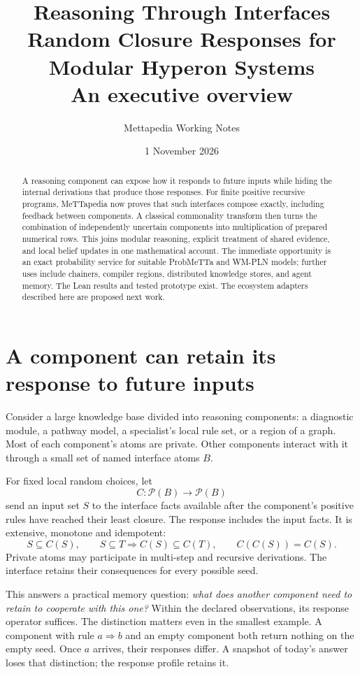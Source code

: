 \documentclass[11pt,a4paper]{article}
\title{Reasoning Through Interfaces\\[3pt]
  \large Random Closure Responses for Modular Hyperon Systems\\
  An executive overview}
\author{Mettapedia Working Notes}
\date{1 November 2026}
\newcommand{\Pow}{\mathcal P}
\begin{document}
\maketitle

\begin{abstract}
A reasoning component can expose how it responds to future inputs while
hiding the internal derivations that produce those responses. For finite
positive recursive programs, MeTTapedia now proves that such interfaces
compose exactly, including feedback between components. A classical
commonality transform then turns the combination of independently uncertain
components into multiplication of prepared numerical rows. This joins
modular reasoning, explicit treatment of shared evidence, and local belief
updates in one mathematical account. The immediate opportunity is an exact
probability service for suitable ProbMeTTa and WM-PLN models; further uses
include chainers, compiler regions, distributed knowledge stores, and agent
memory. The Lean results and tested prototype exist. The ecosystem adapters
described here are proposed next work.
\end{abstract}

\section{A component can retain its response to future inputs}

Consider a large knowledge base divided into reasoning components: a diagnostic
module, a pathway model, a specialist's local rule set, or a region of a graph.
Most of each component's atoms are private. Other components interact with it
through a small set of named interface atoms $B$.

For fixed local random choices, let
\[
 C:\Pow(B)\longrightarrow\Pow(B)
\]
send an input set $S$ to the interface facts available after the component's
positive rules have reached their least closure. The response includes the
input facts. It is extensive, monotone and idempotent:
\[
 S\subseteq C(S),\qquad
 S\subseteq T\Rightarrow C(S)\subseteq C(T),\qquad C(C(S))=C(S).
\]
Private atoms may participate in multi-step and recursive derivations.
The interface retains their consequences for every possible seed.

This answers a practical memory question: \emph{what does another component
need to retain to cooperate with this one?} Within the declared observations,
its response operator suffices. The distinction matters even in the smallest
example. A component with rule $a\Rightarrow b$ and an empty component both
return nothing on the empty seed. Once $a$ arrives, their responses differ.
A snapshot of today's answer loses that distinction; the response profile
retains it.
\end{document}

